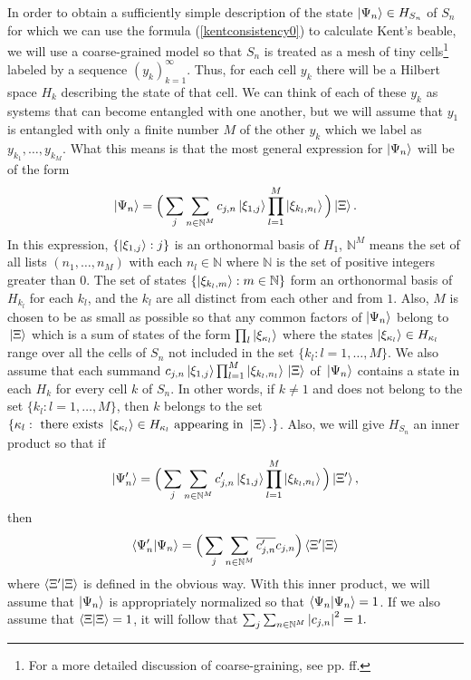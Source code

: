 In order to obtain a sufficiently simple description of the state $\ket{\Psi_n}\in H_{S_n}$ of $S_n$ for which we can use the formula (\ref{kentconsistency0}) to calculate Kent's beable, we will  
use a coarse-grained model so that $S_n$ is treated as a mesh of tiny cells\footnote{For a more detailed discussion of coarse-graining, see pp. \pageref{meshref} ff.} labeled by a sequence $(y_k)_{k=1}^\infty$. Thus, for each cell $y_k$ there will be a Hilbert space $H_k$ describing the state of that cell. We can think of each of these $y_k$ as systems that can become entangled with one another, but we will assume that $y_1$ is entangled with only a finite number $M$ of the other $y_k$ which we label as $y_{k_1}, \ldots, y_{k_M}$. What this means is that the most general expression for $\ket{\Psi_n}$ will be of the form
\begin{equation}\label{Sistate}
\ket{\Psi_n}=\Big(\sum_j\sum_{n\in\mathbb{N}^M} c_{j,n}\ket{\xi_{1,j}}\prod_{l=1}^{M}\ket{\xi_{k_{l},n_l}}\Big)\ket*{\Xi}.
\end{equation}
In this expression, $\{\ket{\xi_{1,j}}:j\}$ is an orthonormal basis of $H_1$, $\mathbb{N}^M$ means the set of all lists $(n_1,\ldots,n_M)$ with each $n_l\in\mathbb{N}$ where $\mathbb{N}$ is the set of positive integers greater than 0. The set of states $\{\ket{\xi_{k_{l},m}}:m\in\mathbb{N}\}$ form an orthonormal basis of $H_{k_{l}}$ for each $k_l$, and the $k_{l}$ are all distinct from each other and from $1$. Also, $M$ is chosen to be as small as possible so that any common factors of $\ket{\Psi_n}$ belong to $\ket*{\Xi}$ which is a sum of states of the form $\prod_l\ket{\xi_{\kappa_l}}$ where the states $\ket{\xi_{\kappa_l}}\in H_{\kappa_l}$ range over all the cells of $S_n$ not included in the set $\{k_{l}:l=1,\ldots,M\}.$ We also assume that each summand $c_{j,n}\ket{\xi_{1,j}}\prod_{l=1}^{M}\ket{\xi_{k_{l},n_l}}\ket*{\Xi}$ of $\ket*{\Psi_n}$ contains a state in each $H_k$ for every cell $k$ of $S_n$. In other words, if $k\neq 1$ and does not belong to the set $\{k_{l}:l=1,\ldots,M\}$, then $k$ belongs to the set $\{\kappa_l:\text{ there exists }\ket*{\xi_{\kappa_l}}\in H_{\kappa_l}\text{ appearing in }\ket*{\Xi}.\}$. Also, we will give $H_{S_n}$ an inner product so that if 
$$ \ket{\Psi_n'}=\Big(\sum_j\sum_{n\in\mathbb{N}^M} c'_{j,n}\ket{\xi_{1,j}}\prod_{l=1}^{M}\ket{\xi_{k_{l},n_l}}\Big)\ket*{\Xi'},$$ then
$$\ip{\Psi_n'}{\Psi_n}=\Big(\sum_j\sum_{n\in\mathbb{N}^M} \overline{c'_{j,n}}c_{j,n} \Big) \ip{\Xi'}{\Xi}$$
where $\ip{\Xi'}{\Xi}$ is defined in the obvious way. With this inner product, we will assume that $\ket{\Psi_n}$ is appropriately normalized so that $\ip{\Psi_n}{\Psi_n}=1$. If we also assume that  $\ip{\Xi}{\Xi}=1$, it will follow that $\sum_j\sum_{n\in\mathbb{N}^M}\abs{c_{j,n}}^2=1.$

